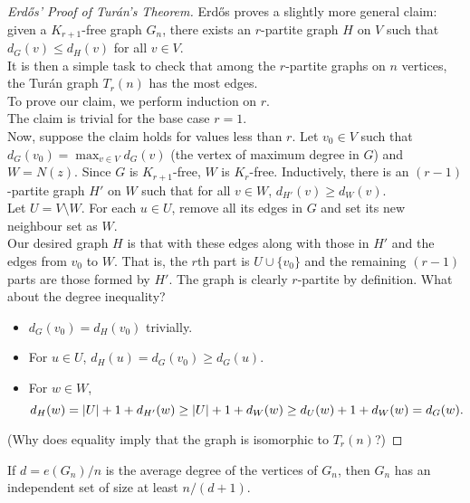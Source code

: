 \documentclass{article}
\begin{document}
		\begin{proof}[Erd\H{o}s' Proof of Tur\'{a}n's Theorem]
			Erd\H{o}s proves a slightly more general claim: given a $K_{r+1}$-free graph $G_n$, there exists an $r$-partite graph $H$ on $V$ such that $d_G(v) \le d_H(v)$ for all $v \in V$.\\
			It is then a simple task to check that among the $r$-partite graphs on $n$ vertices, the Tur\'{a}n graph $T_r(n)$ has the most edges.\\

			To prove our claim, we perform induction on $r$.\\
			The claim is trivial for the base case $r=1$.\\
			Now, suppose the claim holds for values less than $r$. Let $v_0 \in V$ such that $d_G(v_0) = \max_{v \in V} d_G(v)$ (the vertex of maximum degree in $G$) and $W = N(z)$. Since $G$ is $K_{r+1}$-free, $W$ is $K_r$-free. Inductively, there is an $(r-1)$-partite graph $H'$ on $W$ such that for all $v \in W$, $d_{H'}(v) \ge d_W(v)$.\\
			Let $U = V \setminus W$. For each $u \in U$, remove all its edges in $G$ and set its new neighbour set as $W$.\\
			Our desired graph $H$ is that with these edges along with those in $H'$ and the edges from $v_0$ to $W$. That is, the $r$th part is $U \cup \{v_0\}$ and the remaining $(r-1)$ parts are those formed by $H'$. The graph is clearly $r$-partite by definition. What about the degree inequality?
			\begin{itemize}
				\item $d_G(v_0) = d_H(v_0)$ trivially.
				\item For $u \in U$, $d_H(u) = d_G(v_0) \ge d_G(u)$.
				\item For $w \in W$,
				\[ d_H(w) = |U| + 1 + d_{H'}(w) \ge |U| + 1 + d_W(w) \ge d_U(w) + 1 + d_W(w) = d_G(w). \qedhere \]
			\end{itemize}

			(Why does equality imply that the graph is isomorphic to $T_r(n)$?)
		\end{proof}

		\begin{ftheo}
			If $d = e(G_n) / n$ is the average degree of the vertices of $G_n$, then $G_n$ has an independent set of size at least $n/(d+1)$.
		\end{ftheo}
\end{document}
